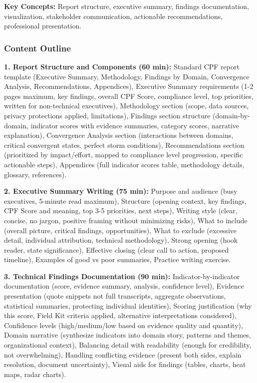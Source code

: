 \documentclass[11pt,a4paper]{article}
\begin{document}
\textbf{Key Concepts:} Report structure, executive summary, findings documentation, visualization, stakeholder communication, actionable recommendations, professional presentation.

\subsubsection{Content Outline}

\textbf{1. Report Structure and Components (60 min):} Standard CPF report template (Executive Summary, Methodology, Findings by Domain, Convergence Analysis, Recommendations, Appendices), Executive Summary requirements (1-2 pages maximum, key findings, overall CPF Score, compliance level, top priorities, written for non-technical executives), Methodology section (scope, data sources, privacy protections applied, limitations), Findings section structure (domain-by-domain, indicator scores with evidence summaries, category scores, narrative explanation), Convergence Analysis section (interactions between domains, critical convergent states, perfect storm conditions), Recommendations section (prioritized by impact/effort, mapped to compliance level progression, specific actionable steps), Appendices (full indicator scores table, methodology details, glossary, references).

\textbf{2. Executive Summary Writing (75 min):} Purpose and audience (busy executives, 5-minute read maximum), Structure (opening context, key findings, CPF Score and meaning, top 3-5 priorities, next steps), Writing style (clear, concise, no jargon, positive framing without minimizing risks), What to include (overall picture, critical findings, opportunities), What to exclude (excessive detail, individual attribution, technical methodology), Strong opening (hook reader, state significance), Effective closing (clear call to action, proposed timeline), Examples of good vs poor summaries, Practice writing exercise.

\textbf{3. Technical Findings Documentation (90 min):} Indicator-by-indicator documentation (score, evidence summary, analysis, confidence level), Evidence presentation (quote snippets not full transcripts, aggregate observations, statistical summaries, protecting individual identities), Scoring justification (why this score, Field Kit criteria applied, alternative interpretations considered), Confidence levels (high/medium/low based on evidence quality and quantity), Domain narrative (synthesize indicators into domain story, patterns and themes, organizational context), Balancing detail with readability (enough for credibility, not overwhelming), Handling conflicting evidence (present both sides, explain resolution, document uncertainty), Visual aids for findings (tables, charts, heat maps, radar charts).
\end{document}
